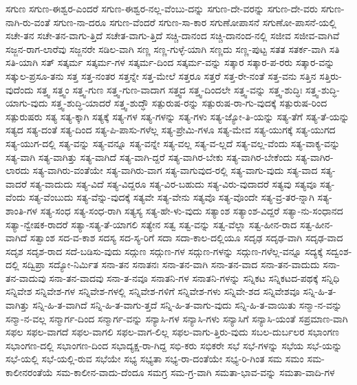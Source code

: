 {ಸಗುಣ
ಸಗುಣ-ಈಶ್ವರ-ಎಂದರೆ
ಸಗುಣ-ಈಶ್ವರ-ನಲ್ಲ-ವೆಂಬು-ದನ್ನು
ಸಗುಣ-ದೇ-ವರನ್ನು
ಸಗುಣ-ದೇ-ವರು
ಸಗುಣ-ನಾಗಿ-ರು-ವಂತೆ
ಸಗುಣ-ನಾ-ದರೂ
ಸಗುಣ-ವೆಂದರೆ
ಸಗುಣ-ಸಾ-ಕಾರ
ಸಗುಣೋಪಾಸನೆ
ಸಗುಣೋ-ಪಾಸನೆ-ಯಲ್ಲಿ
ಸಚೇ-ತನ
ಸಚೇ-ತನ-ವಾಗು-ತ್ತಿದೆ
ಸಚೇತ-ವಾಗು-ತ್ತಿದೆ
ಸಚ್ಚಿ-ದಾನಂದ
ಸಚ್ಚಿ-ದಾನಂದ-ನಲ್ಲಿ
ಸಜೀವ
ಸಜೀವ-ವಾಗಿವೆ
ಸಜ್ಜನ-ರಾಗ-ಲಾರೆವು
ಸಜ್ಜನರೇ
ಸಡಿಲ-ವಾಗಿ
ಸಣ್ಣ
ಸಣ್ಣ-ಗುಳ್ಳೆ-ಯಾಗಿ
ಸಣ್ಣದು
ಸಣ್ಣ-ಪುಟ್ಟ
ಸತತ
ಸತರ್ಕ-ವಾಗಿ
ಸತಿ
ಸತಿ-ಯಾಗಿ
ಸತ್
ಸತ್ಕರ್ಮ
ಸತ್ಕರ್ಮ-ಗಳ
ಸತ್ಕರ್ಮ-ದಿಂದ
ಸತ್ಕರ್ಮ-ವನ್ನು
ಸತ್ಕಾರ
ಸತ್ಕಾರ-ಪ-ರರು
ಸತ್ಕಾರ-ವನ್ನು
ಸತ್ಕುಲ-ಪ್ರಸೂ-ತನು
ಸತ್ತ
ಸತ್ತ-ನಂತರ
ಸತ್ತನ್ನೇ
ಸತ್ತ-ಮೇಲೆ
ಸತ್ತರೂ
ಸತ್ತರೆ
ಸತ್ತ-ರೇ-ನಂತೆ
ಸತ್ತ-ವನು
ಸತ್ತಿನ
ಸತ್ತಿರು-ವುದೆಂದು
ಸತ್ತ್ವ
ಸತ್ತ್ವಂ
ಸತ್ತ್ವ-ಗುಣ
ಸತ್ತ್ವ-ಗುಣ-ವಾದಾಗ
ಸತ್ತ್ವದ
ಸತ್ತ್ವ-ದಿಂದಲೇ
ಸತ್ತ್ವ-ವನ್ನು
ಸತ್ತ್ವ-ಶುದ್ಧಿಃ
ಸತ್ತ್ವ-ಶುದ್ಧಿ-ಯಾಗು-ವುದು
ಸತ್ತ್ವ-ಶುದ್ಧಿ-ಯಾದರೆ
ಸತ್ತ್ವ-ಶುದ್ಧೌ
ಸತ್ಪುರುಷ-ರನ್ನು
ಸತ್ಪುರುಷ-ರಾ-ಗು-ವುದಕ್ಕೆ
ಸತ್ಪುರುಷ-ರಿಂದ
ಸತ್ಪುರುಷರು
ಸತ್ಯ
ಸತ್ಯ-ಕ್ಕಾಗಿ
ಸತ್ಯಕ್ಕೆ
ಸತ್ಯ-ಗಳ
ಸತ್ಯ-ಗಳನ್ನು
ಸತ್ಯ-ಗಳು
ಸತ್ಯ-ಜ್ಯೋ-ತಿ-ಯನ್ನು
ಸತ್ಯ-ತೆಗೆ
ಸತ್ಯ-ತೆ-ಯನ್ನು
ಸತ್ಯದ
ಸತ್ಯ-ದಂತೆ
ಸತ್ಯ-ದಿಂದ
ಸತ್ಯ-ಪಿ-ಪಾಸು-ಗಳೆಲ್ಲ
ಸತ್ಯ-ಪ್ರೇಮಿ-ಗಳೂ
ಸತ್ಯ-ಮೇವ
ಸತ್ಯ-ಯುಗಕ್ಕೆ
ಸತ್ಯ-ಯುಗದ
ಸತ್ಯ-ಯುಗ-ದಲ್ಲಿ
ಸತ್ಯ-ವನ್ನು
ಸತ್ಯ-ವನ್ನೂ
ಸತ್ಯ-ವನ್ನೇ
ಸತ್ಯ-ವಲ್ಲ
ಸತ್ಯ-ವ-ಲ್ಲದೆ
ಸತ್ಯ-ವಲ್ಲ-ವೆಂದು
ಸತ್ಯ-ವಾಕ್ಯ-ವನ್ನು
ಸತ್ಯ-ವಾಗಿ
ಸತ್ಯ-ವಾಗಿತ್ತು
ಸತ್ಯ-ವಾಗಿದೆ
ಸತ್ಯ-ವಾಗಿ-ದ್ದರೆ
ಸತ್ಯ-ವಾಗಿರ-ಬೇಕು
ಸತ್ಯ-ವಾಗಿರ-ಬೇಕೆಂದು
ಸತ್ಯ-ವಾಗಿರ-ಲಾರದು
ಸತ್ಯ-ವಾಗಿರು-ವಂತೆಯೇ
ಸತ್ಯ-ವಾಗಿರು-ವಾಗ
ಸತ್ಯ-ವಾಗುವುದ-ರಲ್ಲಿ
ಸತ್ಯ-ವಾಗು-ವುದು
ಸತ್ಯ-ವಾದ
ಸತ್ಯ-ವಾದರೆ
ಸತ್ಯ-ವಾದುದು
ಸತ್ಯ-ವಿದೆ
ಸತ್ಯ-ವಿದ್ದರೂ
ಸತ್ಯ-ವಿರ-ಬಹುದು
ಸತ್ಯ-ವಿರು-ವುದಾದರೆ
ಸತ್ಯವು
ಸತ್ಯವೂ
ಸತ್ಯ-ವೆಂದು
ಸತ್ಯ-ವೆಂಬುದು
ಸತ್ಯ-ವೆನ್ನು-ವುದಕ್ಕೆ
ಸತ್ಯವೇ
ಸತ್ಯ-ವೇನು
ಸತ್ಯವೊ
ಸತ್ಯ-ವೊಂದೇ
ಸತ್ಯ-ವ್ರ-ತರ-ನ್ನಾಗಿ
ಸತ್ಯ-ಶಾಂತಿ-ಗಳ
ಸತ್ಯ-ಸಂಧ
ಸತ್ಯ-ಸಂಧ-ರಾಗಿ
ಸತ್ಯಸ್ಯ
ಸತ್ಯ-ಹೇ-ಳು-ವುದು
ಸತ್ಯಾಂಶ
ಸತ್ಯಾಂಶ-ವಿದ್ದರೆ
ಸತ್ಯಾ-ನು-ಸಂಧಾನದ
ಸತ್ಯಾ-ನ್ವೇಷಕ-ರಾದರೆ
ಸತ್ಯಾ-ಸತ್ಯ-ತೆ-ಯಾಗಲಿ
ಸತ್ಯೇನ
ಸತ್ವ
ಸತ್ವ-ವನ್ನು
ಸತ್ವ-ವೆಲ್ಲಾ
ಸತ್ವ-ಹೀನ-ರಾದ
ಸತ್ವ-ಹೀನ-ವಾಗಿದೆ
ಸತ್ವಾಂಶ
ಸದ-ವ-ಕಾಶ
ಸದಸ್ಯ
ಸದ-ಸ್ಯ-ರಿಗೆ
ಸದಾ
ಸದಾ-ಕಾಲ-ದಲ್ಲಿಯೂ
ಸದೃಢ
ಸದೃಢ-ವಾಗಿ
ಸದೃಢ-ವಾದ
ಸದೃಶ
ಸದೃಶ-ರಾದ
ಸದೆ-ಬಡಿಸು-ವುದು
ಸದ್ಗುಣ
ಸದ್ಗುಣ-ಗಳ
ಸದ್ಗುಣ-ಗಳನ್ನು
ಸದ್ಗುಣ-ಗಳೆಲ್ಲ-ವನ್ನೂ
ಸದ್ಯಕ್ಕೆ
ಸದ್ವಂಶ-ದಲ್ಲಿ
ಸದ್ವಿಪ್ರಾ
ಸದ್ಯೋ-ನಿರ್ಮಿತ
ಸನಾ-ತನ
ಸನಾತನಃ
ಸನಾ-ತನ-ವಾಗಿ
ಸನಾ-ತನ-ವಾದ
ಸನಾ-ತನ-ವಾದುದು
ಸನಾ-ತನ-ವಾದುವು
ಸನಾ-ತನ-ವಾದವು
ಸನಾ-ತ-ನವೂ
ಸನಾತನಿ-ಗಳ
ಸನಾತನಿ-ಗಳನ್ನು
ಸನ್ನಿಕಟ
ಸನ್ನಿಕಟದ-ಪಥಕ್ಕೆ
ಸನ್ನಿಧಿ
ಸನ್ನಿವೇಶ
ಸನ್ನಿವೇಶ-ಗಳ
ಸನ್ನಿವೇಶ-ಗಳಲ್ಲಿ
ಸನ್ನಿವೇಶ-ಗಳಿಗೆ
ಸನ್ನಿವೇಶ-ಗಳು
ಸನ್ನಿವೇ-ಶದ
ಸನ್ನಿವೇಶವೂ
ಸನ್ನಿ-ಹಿ-ತ-ವಾಗಿತ್ತು
ಸನ್ನಿ-ಹಿ-ತ-ವಾಗಿದೆ
ಸನ್ನಿ-ಹಿ-ತ-ವಾಗು-ತ್ತದೆ
ಸನ್ನಿ-ಹಿ-ತ-ವಾಗು-ವುದು
ಸನ್ನಿ-ಹಿ-ತ-ವಾಯಿತು
ಸನ್ಮಾ-ನ-ವನ್ನು
ಸನ್ಮಾ-ನ-ವಲ್ಲ
ಸನ್ಮಾರ್ಗ-ದಿಂದ
ಸನ್ಮಾರ್ಗ-ವನ್ನು
ಸನ್ಯಾಸಿ-ಗಳ
ಸನ್ಯಾಸಿ-ಗಳು
ಸನ್ಯಾಸಿಗೆ
ಸನ್ಯಾಸಿ-ಯಂತೆ
ಸಪ್ರಮಾಣ-ವಾಗಿ
ಸಫಲ
ಸಫಲ-ವಾಗದೆ
ಸಫಲ-ವಾಗಲಿ
ಸಫಲ-ವಾಗ-ಲಿಲ್ಲ
ಸಫಲ-ವಾಗು-ತ್ತಿರು-ವುದು
ಸಬಲ-ದುರ್ಬಲರ
ಸಭಾಂಗಣ
ಸಭಾಂಗಣ-ದಲ್ಲಿ
ಸಭಾಂಗಣ-ದಿಂದ
ಸಭಾದ್ಯಕ್ಷ-ರಾ-ಗಿದ್ದ
ಸಭಿ-ಕರು
ಸಭಿಕರೇ
ಸಭೆ
ಸಭೆ-ಗಳನ್ನು
ಸಭೆಯ
ಸಭೆ-ಯನ್ನು
ಸಭೆ-ಯಲ್ಲಿ
ಸಭೆ-ಯಲ್ಲಿ-ರುವ
ಸಭೆಯೇ
ಸಭ್ಯ
ಸಭ್ಯತಾ
ಸಭ್ಯ-ರಾ-ದಂತೆಯೇ
ಸಭ್ಯ-ರಿ-ಗಿಂತ
ಸಮ
ಸಮಂ
ಸಮ-ಕಾಲೀನರಂತೆಯೆ
ಸಮ-ಕಾಲೀನ-ವಾದು-ದೆಂದೂ
ಸಮಗ್ರ
ಸಮ-ಗ್ರ-ವಾಗಿ
ಸಮತಾ-ಭಾವ-ವನ್ನು
ಸಮತಾ-ವಾದಿ-ಗಳ
}

